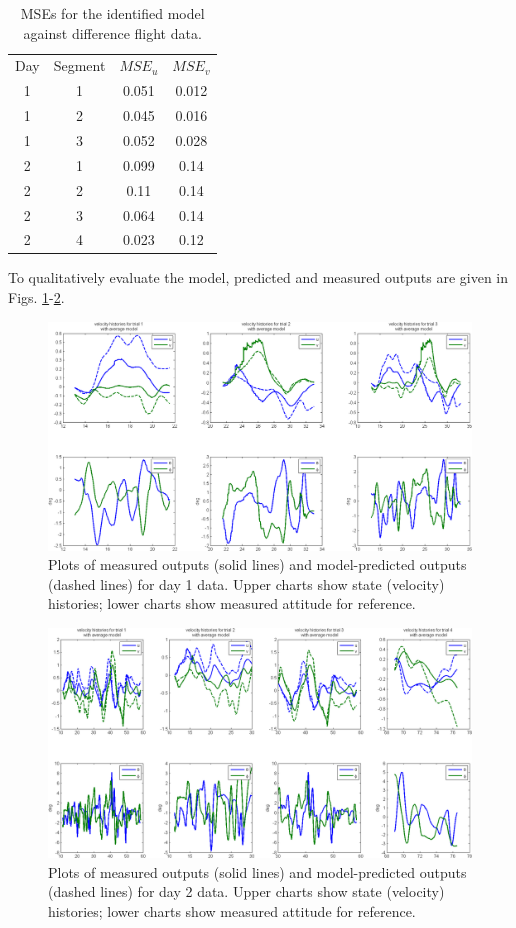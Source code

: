 \documentclass{aiaa-tc}
\begin{document}
\begin{table}[tb!]
\centering
\begin{tabular}{c|c|c|c}
Day & Segment & $MSE_u$ & $MSE_v$ \\
1 & 1 & 0.051 & 0.012 \\
1 & 2 & 0.045  &   0.016\\
1 & 3 & 0.052  &   0.028\\
2 & 1 & 0.099  &    0.14\\
2 & 2 & 0.11  &     0.14\\
2 & 3 & 0.064 &   0.14\\
2 & 4 & 0.023  &   0.12\\
\end{tabular}
\caption{MSEs for the identified model against difference flight data.}
\label{tab:mses}
\end{table}

To qualitatively evaluate the model, predicted and measured outputs are given in Figs. \ref{fig:day1mse}-\ref{fig:day2mse}.

\begin{figure}[tb!]
\centering
\includegraphics[width = \textwidth]{model_day_1.png}
\caption{Plots of measured outputs (solid lines) and model-predicted outputs (dashed lines) for day 1 data. Upper charts show state (velocity) histories; lower charts show measured attitude for reference.}
\label{fig:day1mse}
\end{figure}

\begin{figure}[tb!]
\centering
\includegraphics[width = \textwidth]{model_day_2.png}
\caption{Plots of measured outputs (solid lines) and model-predicted outputs (dashed lines) for day 2 data. Upper charts show state (velocity) histories; lower charts show measured attitude for reference.}
\label{fig:day2mse}
\end{figure}
\end{document}
